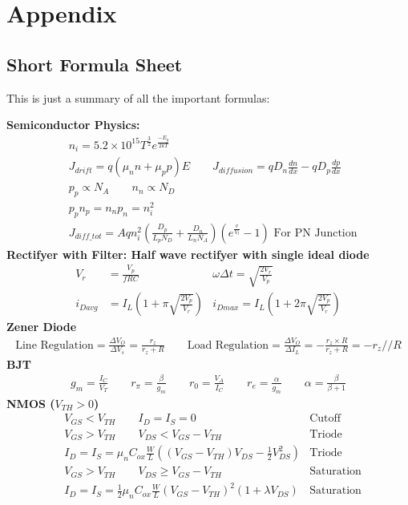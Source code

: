 \documentclass[12pt,letterpaper]{article} \usepackage{amsmath} \usepackage{graphicx} \usepackage[margin=1in]{geometry} \usepackage{longtable}  \usepackage{amssymb}
\begin{document}
	
	\newpage
	\section{Appendix}
	\subsection{Short Formula Sheet}
	This is just a summary of all the important formulas:
	
\textbf{Semiconductor Physics:}
	\begin{align*}
&		n_i = 5.2\times 10^{15} T^{\frac{3}{2}} e^\frac{-E_g}{2kT}\\
&		J_{drift} = q(\mu_n n+ \mu_p p) E \qquad J_{diffusion} = qD_n \frac{dn}{dx} - qD_p \frac{dp}{dx}\\
&		p_p \propto N_A \qquad n_n \propto N_D\\
&		p_pn_p = n_np_n = n_i^2\\
& 		J_{diff\_tot} = Aqn_i^2\left(\frac{D_p}{L_pN_D}+\frac{D_n}{L_nN_A}\right)\left(e^{\frac{v}{V_t}}-1\right) \text{ For PN Junction}
	\end{align*}
	\textbf{Rectifyer with Filter: Half wave rectifyer with single ideal diode}
	\begin{align*}
		V_r &= \frac{V_p}{fRC} &\omega\Delta t = \sqrt{\frac{2V_r}{V_p}} \\
		i_{Davg} &= I_L(1+\pi\sqrt{\frac{2V_p}{V_r}}) &i_{Dmax} = I_L(1+2\pi\sqrt{\frac{2V_p}{V_r}}) 
	\end{align*}
	\textbf{Zener Diode}
	\begin{align*}
		\text{Line Regulation}=\frac{\Delta V_O}{\Delta V_s} = \frac{r_z}{r_z+R} \qquad \text{Load Regulation}=\frac{\Delta V_O}{\Delta I_L} = -\frac{r_z\times R}{r_z+R} = -r_z // R
	\end{align*}
	\textbf{BJT}
	\begin{align*}
		g_m = \frac{I_C}{V_T} \qquad r_\pi = \frac{\beta}{g_m} \qquad r_0 = \frac{V_A}{I_C} \qquad r_e = \frac{\alpha}{g_m} \qquad \alpha = \frac{\beta}{\beta+1}
	\end{align*}
	\textbf{NMOS ($V_{TH}>0$)}
	\begin{align*}
		&V_{GS} < V_{TH} \qquad I_D = I_S = 0 &\text{Cutoff}\\
		&V_{GS} > V_{TH} \qquad V_{DS} < V_{GS} - V_{TH} &\text{Triode}\\
		&I_D = I_S = \mu_n C_{ox} \frac{W}{L} \left((V_{GS}-V_{TH})V_{DS} - \frac{1}{2}V^2_{DS}\right)&\text{Triode}\\
		&V_{GS} > V_{TH} \qquad V_{DS} \ge V_{GS} - V_{TH}&\text{Saturation}\\
		&I_D = I_S = \frac{1}{2}\mu_n C_{ox} \frac{W}{L} (V_{GS} - V_{TH})^2(1+\lambda V_{DS})&\text{Saturation}
	\end{align*}
\end{document}

